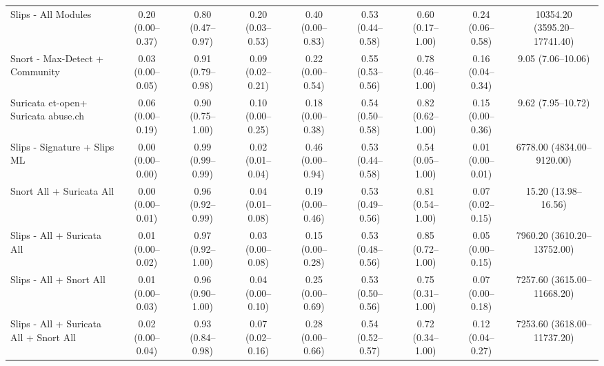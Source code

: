 \begin{table}[t]
{\begin{tabular}{lcccccccc}
        Slips - All Modules & 0.20 (0.00–0.37) & 0.80 (0.47–0.97) & 0.20 (0.03–0.53) & 0.40 (0.00–0.83) & 0.53 (0.44–0.58) & 0.60 (0.17–1.00) & 0.24 (0.06–0.58) & 10354.20 (3595.20–17741.40) \\
        Snort - Max-Detect + Community & 0.03 (0.00–0.05) & 0.91 (0.79–0.98) & 0.09 (0.02–0.21) & 0.22 (0.00–0.54) & 0.55 (0.53–0.56) & 0.78 (0.46–1.00) & 0.16 (0.04–0.34) & 9.05 (7.06–10.06) \\
        Suricata et-open+ Suricata abuse.ch & 0.06 (0.00–0.19) & 0.90 (0.75–1.00) & 0.10 (0.00–0.25) & 0.18 (0.00–0.38) & 0.54 (0.50–0.58) & 0.82 (0.62–1.00) & 0.15 (0.00–0.36) & 9.62 (7.95–10.72) \\
        Slips - Signature + Slips ML & 0.00 (0.00–0.00) & 0.99 (0.99–0.99) & 0.02 (0.01–0.04) & 0.46 (0.00–0.94) & 0.53 (0.44–0.58) & 0.54 (0.05–1.00) & 0.01 (0.00–0.01) & 6778.00 (4834.00–9120.00) \\
        Snort All + Suricata All & 0.00 (0.00–0.01) & 0.96 (0.92–0.99) & 0.04 (0.01–0.08) & 0.19 (0.00–0.46) & 0.53 (0.49–0.56) & 0.81 (0.54–1.00) & 0.07 (0.02–0.15) & 15.20 (13.98–16.56) \\
        Slips - All + Suricata All & 0.01 (0.00–0.02) & 0.97 (0.92–1.00) & 0.03 (0.00–0.08) & 0.15 (0.00–0.28) & 0.53 (0.48–0.56) & 0.85 (0.72–1.00) & 0.05 (0.00–0.15) & 7960.20 (3610.20–13752.00) \\
        Slips - All + Snort All & 0.01 (0.00–0.03) & 0.96 (0.90–1.00) & 0.04 (0.00–0.10) & 0.25 (0.00–0.69) & 0.53 (0.50–0.56) & 0.75 (0.31–1.00) & 0.07 (0.00–0.18) & 7257.60 (3615.00–11668.20) \\
        Slips - All + Suricata All + Snort All & 0.02 (0.00–0.04) & 0.93 (0.84–0.98) & 0.07 (0.02–0.16) & 0.28 (0.00–0.66) & 0.54 (0.52–0.57) & 0.72 (0.34–1.00) & 0.12 (0.04–0.27) & 7253.60 (3618.00–11737.20) \\
        \bottomrule
    \end{tabular}
}
\end{table}

